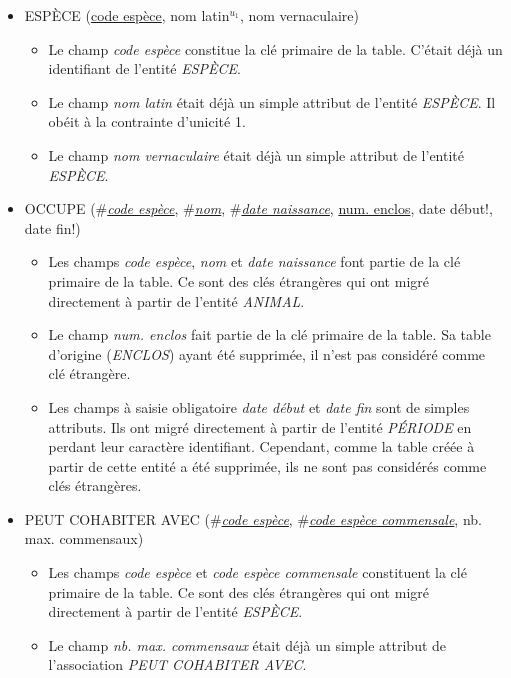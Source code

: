 \documentclass[a4paper]{article}
\newcommand{\relat}[1]{\textsc{#1}}
\newcommand{\attr}[1]{#1}
\newcommand{\prim}[1]{\uline{#1}}
\newcommand{\foreign}[1]{\#\textsl{#1}}
\begin{document}
\begin{itemize}
  \item \relat{ESPÈCE} (\prim{code espèce}, \attr{nom latin}$^{u_1}$, \attr{nom vernaculaire})
  \begin{itemize}
    \item Le champ \emph{code espèce} constitue la clé primaire de la table. C'était déjà un identifiant de l'entité \emph{ESPÈCE}.
    \item Le champ \emph{nom latin} était déjà un simple attribut de l'entité \emph{ESPÈCE}. Il obéit à la contrainte d'unicité 1.
    \item Le champ \emph{nom vernaculaire} était déjà un simple attribut de l'entité \emph{ESPÈCE}.
  \end{itemize}

  \item \relat{OCCUPE} (\foreign{\prim{code espèce}}, \foreign{\prim{nom}}, \foreign{\prim{date naissance}}, \prim{num. enclos}, \attr{date début!}, \attr{date fin!})
  \begin{itemize}
    \item Les champs \emph{code espèce}, \emph{nom} et \emph{date naissance} font partie de la clé primaire de la table. Ce sont des clés étrangères qui ont migré directement à partir de l'entité \emph{ANIMAL}.
    \item Le champ \emph{num. enclos} fait partie de la clé primaire de la table. Sa table d'origine (\emph{ENCLOS}) ayant été supprimée, il n'est pas considéré comme clé étrangère.
    \item Les champs à saisie obligatoire \emph{date début} et \emph{date fin} sont de simples attributs. Ils ont migré directement à partir de l'entité \emph{PÉRIODE} en perdant leur caractère identifiant. Cependant, comme la table créée à partir de cette entité a été supprimée, ils ne sont pas considérés comme clés étrangères.
  \end{itemize}

  \item \relat{PEUT COHABITER AVEC} (\foreign{\prim{code espèce}}, \foreign{\prim{code espèce commensale}}, \attr{nb. max. commensaux})
  \begin{itemize}
    \item Les champs \emph{code espèce} et \emph{code espèce commensale} constituent la clé primaire de la table. Ce sont des clés étrangères qui ont migré directement à partir de l'entité \emph{ESPÈCE}.
    \item Le champ \emph{nb. max. commensaux} était déjà un simple attribut de l'association \emph{PEUT COHABITER AVEC}.
  \end{itemize}


\end{itemize}
\end{document}
